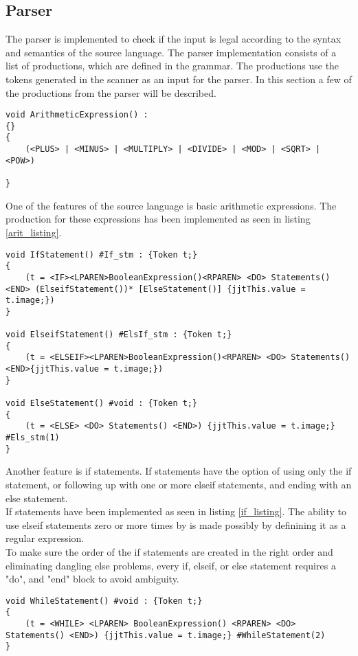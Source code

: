 \subsection{Parser}
The parser is implemented to check if the input is legal according to the syntax and semantics of the source language. The parser implementation consists of a list of productions, which are defined in the grammar. The productions use the tokens generated in the scanner as an input for the parser. In this section a few of the productions from the parser will be described. 

\begin{lstlisting}[caption=Implementation of the arithmetic expressions production, label=arit_listing]
void ArithmeticExpression() :
{}
{
	(<PLUS> | <MINUS> | <MULTIPLY> | <DIVIDE> | <MOD> | <SQRT> | <POW>)

}

\end{lstlisting}

One of the features of the source language is basic arithmetic expressions. The production for these expressions has been implemented as seen in listing \ref{arit_listing}. 

\begin{lstlisting}[caption=Implementation of the if\, elseif\, and else statements, label=if_listing]
void IfStatement() #If_stm : {Token t;}
{
	(t = <IF><LPAREN>BooleanExpression()<RPAREN> <DO> Statements() <END> (ElseifStatement())* [ElseStatement()] {jjtThis.value = t.image;})
}

void ElseifStatement() #ElsIf_stm : {Token t;}
{
	(t = <ELSEIF><LPAREN>BooleanExpression()<RPAREN> <DO> Statements() <END>{jjtThis.value = t.image;})
}

void ElseStatement() #void : {Token t;}
{
	(t = <ELSE> <DO> Statements() <END>) {jjtThis.value = t.image;} #Els_stm(1)
}
\end{lstlisting}

Another feature is if statements. If statements have the option of using only the if statement, or following up with one or more elseif statements, and ending with an else statement. 
\\If statements have been implemented as seen in listing \ref{if_listing}. The ability to use elseif statements zero or more times by is made possibly by definining it as a regular expression. 
\\To make sure the order of the if statements are created in the right order and eliminating dangling else problems, every if, elseif, or else statement requires a "do", and "end" block to avoid ambiguity.

\begin{lstlisting}[caption=Implementation of the while statement, label=while_listing]
void WhileStatement() #void : {Token t;}
{
	(t = <WHILE> <LPAREN> BooleanExpression() <RPAREN> <DO> Statements() <END>) {jjtThis.value = t.image;} #WhileStatement(2)
}
\end{lstlisting}

